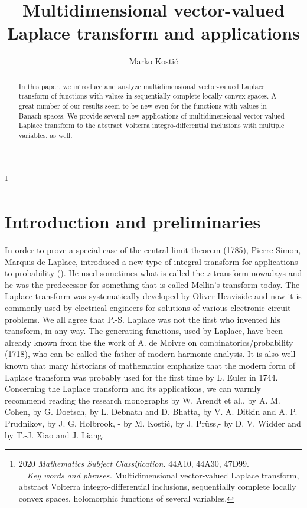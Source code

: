 \documentclass{amsart}
\theoremstyle{definition}
\theoremstyle{remark}
\numberwithin{equation}{section}
\begin{document}
\title[Multidimensional vector-valued Laplace transform...]{Multidimensional vector-valued Laplace transform and applications}

\author{Marko Kosti\' c}
\address{Faculty of Technical Sciences,
University of Novi Sad,
Trg D. Obradovi\' ca 6, 21125 Novi Sad, Serbia}

{\renewcommand{\thefootnote}{} \footnote{2020 {\it Mathematics
Subject Classification.} 44A10, 44A30, 47D99.
\\ \text{  }  \ \    {\it Key words and phrases.} Multidimensional vector-valued Laplace transform, abstract Volterra integro-differential inclusions, sequentially complete locally convex spaces, holomorphic functions of several variables.}}

\begin{abstract}
In this paper, we introduce and analyze multidimensional vector-valued Laplace transform of functions with values in sequentially complete locally convex spaces. A great number of our results seem to be new even for the functions with values in Banach spaces. We provide several new applications of multidimensional vector-valued Laplace transform to the abstract Volterra integro-differential inclusions with multiple variables, as well.
\end{abstract}
\maketitle

\section{Introduction and preliminaries}

In order to prove a special case of the central limit theorem (1785), Pierre-Simon, Marquis de Laplace, introduced a new type of integral transform for applications to probability (\cite{ps laplace}). He used sometimes what is called the $z$-transform nowadays and he was the predecessor for something that is called Mellin's transform today. The Laplace transform was systematically developed by Oliver Heaviside and now it is commonly used by electrical engineers for solutions of various electronic circuit problems. We all agree
that P.-S. Laplace was not the first who invented his transform, in any way. The generating functions, used by Laplace, have been already known from the the work of A. de Moivre on combinatorics/probability (1718), who can be called the father of modern  harmonic analysis. It is also well-known that many historians of mathematics emphasize that the modern form of 
Laplace transform was probably used for the first time by L. Euler in 1744. Concerning the Laplace transform and its applications, we can warmly recommend reading the research monographs \cite{a43} by W. Arendt et al., \cite{cohen} by 
A. M. Cohen, \cite{dech} by G. Doetsch, \cite{debnathb} by
L. Debnath and D. Bhatta, \cite{ditkin} by V. A.
Ditkin and A. P. Prudnikov, \cite{holbruk} by
J. G. Holbrook, \cite{knjigaho}-\cite{FKP}
by M. Kosti\' c, \cite{prus} by J. Pr\"uss,\cite{wider}-\cite{wider1} by
D. V. Widder and \cite{x263}
by
T.-J. Xiao and J. Liang.
\end{document}
